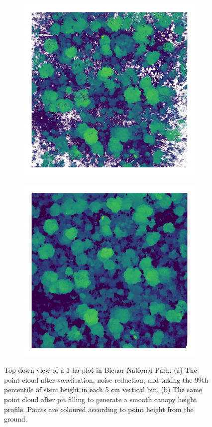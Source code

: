 \documentclass[11pt,a4paper]{article}
\begin{document}
\begin{figure}
	\begin{subfigure}{0.45\linewidth}
		\includegraphics[width=\linewidth]{P1_raw}
		\caption{}
		\label{P1_raw}
	\end{subfigure}
	\hfill
	\begin{subfigure}{0.45\linewidth}
		\includegraphics[width=\linewidth]{P1_pit}
		\caption{}
		\label{P1_pit}
	\end{subfigure}
	\caption{Top-down view of a 1 ha plot in Bicuar National Park. (a) The point cloud after voxelisation, noise reduction, and taking the 99th percentile of stem height in each 5 cm vertical bin. (b) The same point cloud after pit filling to generate a smooth canopy height profile. Points are coloured according to point height from the ground.}
	\label{P1_both}
\end{figure}
\end{document}
